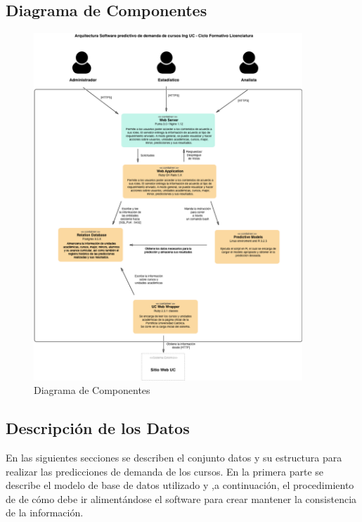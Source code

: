 \subsection{Diagrama de Componentes \label{sec:components_diagram}}

	\begin{figure}[H]
		\begin{center}
			\includegraphics[width=0.9\textwidth]{./figures/chapter_03/03_diagrama_de_componentes.png}
			\caption{Diagrama de Componentes}
			\label{fig:components_diagram_picture}
		\end{center}
	\end{figure}


\subsection{Descripción de los Datos \label{sec:data_description}}

En las siguientes secciones se describen el conjunto datos y su estructura para realizar las predicciones de demanda de los cursos. En la primera parte se describe el modelo de base de datos utilizado y ,a continuación, el procedimiento de de cómo debe ir alimentándose el software para crear mantener la consistencia de la información.

